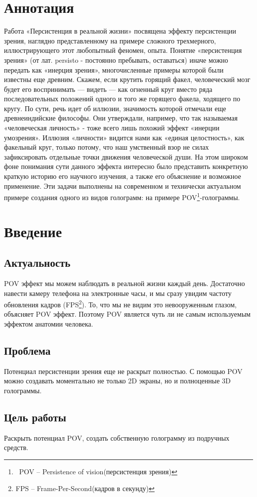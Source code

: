 \documentclass[a4paper, 12pt]{article}
\begin{document}
\section{Аннотация}
Работа «Персистенция в реальной жизни» посвящена эффекту
персистенции зрения, наглядно представленному на примере сложного
трехмерного, иллюстрирующего этот любопытный феномен, опыта.
Понятие «персистенция зрения» (от лат. persisto - постоянно
пребывать, оставаться) иначе можно передать как «инерция зрения»,
многочисленные примеры которой были известны еще древним. Скажем,
если крутить горящий факел, человеческий мозг будет его
воспринимать — видеть — как огненный круг вместо ряда
последовательных положений одного и того же горящего факела,
ходящего по кругу. По сути, речь идет об иллюзии, значимость
которой отмечали еще древнеиндийские философы. Они утверждали,
например, что так называемая «человеческая личность»    - тоже
всего лишь похожий эффект «инерции умозрения». Иллюзия «личности»
видится нами как «единая целостность», как факельный круг, только
потому, что наш умственный взор не силах зафиксировать отдельные
точки движения человеческой души. На этом широком фоне понимания
сути данного эффекта интересно было представить конкретную краткую
историю его научного изучения, а также его объяснение и возможное
применение. Эти задачи выполнены на современном и технически
актуальном примере создания одного из видов голограмм: на примере
POV\footnote{\ POV -- Persistence of vision(персистенция зрения)}-голограммы.
\newpage
\section{Введение}
\subsection{Актуальность}
POV эффект мы можем наблюдать в реальной жизни каждый день.
Достаточно навести камеру телефона на электронные часы,
и мы сразу увидим частоту обновления кадров (FPS\footnote{FPS -- Frame-Per-Second(кадров в секунду)}).
То, что мы не видим это невооруженным глазом, объясняет POV эффект.
Поэтому POV является чуть ли не самым используемым эффектом анатомии человека.
\subsection{Проблема}
Потенциал персистенции зрения еще не раскрыт полностью. С помощью POV можно
создавать моментально не только 2D экраны, но и полноценные 3D голограммы.
\subsection{Цель работы}
Раскрыть потенциал POV, создать собственную голограмму из подручных средств.
\end{document}
